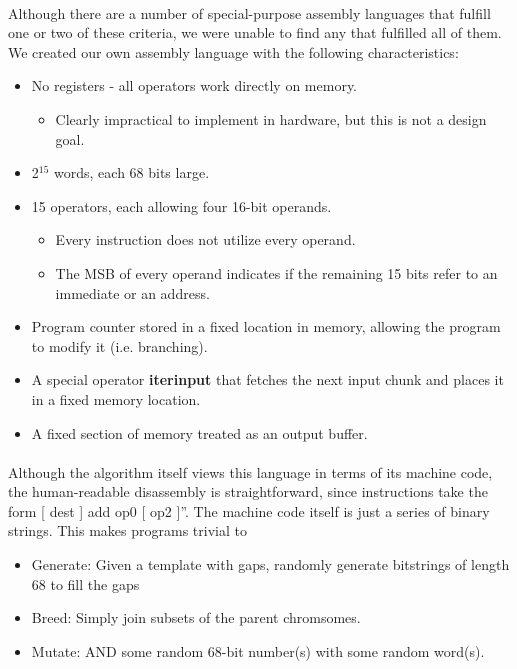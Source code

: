 \documentclass{article}
\begin{document}
\paragraph{}
 
Although there are a number of special-purpose assembly languages that fulfill one or two of these criteria, we were unable to find any that fulfilled all of them. We created our own assembly language with the following characteristics:

\begin{itemize}
\item No registers - all operators work directly on memory.
	\begin{itemize}
          \item Clearly impractical to implement in hardware, but this is not a design goal.
	\end{itemize}
\item 2$^{15}$ words, each 68 bits large.
\item 15 operators, each allowing four 16-bit operands.
	\begin{itemize}
          \item Every instruction does not utilize every operand.
          \item The MSB of every operand indicates if the remaining 15 bits refer to an immediate or an address.
	\end{itemize}
\item Program counter stored in a fixed location in memory, allowing the program to modify it (i.e. branching).
\item A special operator \textbf{iterinput} that fetches the next input chunk and places it in a fixed memory location.
\item A fixed section of memory treated as an output buffer.
\end{itemize}

\paragraph{} 
Although the algorithm itself views this language in terms of its machine code, the human-readable disassembly is straightforward, since instructions take the form [ dest ] add op0 [ op2 ]”. The machine code itself is just a series of binary strings. This makes programs trivial to
	\begin{itemize}
	\item Generate: Given a template with gaps, randomly generate bitstrings of length 68 to fill the gaps
	\item Breed: Simply join subsets of the parent chromsomes.
	\item Mutate: AND some random 68-bit number(s) with some random word(s).
	\end{itemize}
\end{document}
